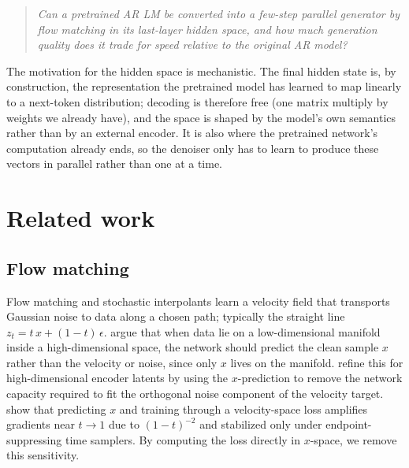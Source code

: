 \documentclass[11pt]{article}
\begin{document}
\begin{quote}\itshape
Can a pretrained AR LM be converted into a few-step parallel generator by flow matching in its last-layer hidden space, and how much generation quality does it trade for speed relative to the original AR model?
\end{quote}

The motivation for the hidden space is mechanistic. The final hidden state is, by construction, the representation the pretrained model has learned to map linearly to a next-token distribution; decoding is therefore free (one matrix multiply by weights we already have), and the space is shaped by the model's own semantics rather than by an external encoder. It is also where the pretrained network's computation already ends, so the denoiser only has to learn to produce these vectors in parallel rather than one at a time.

\section{Related work}

\subsection{Flow matching}
Flow matching \citep{lipman2023flow,liu2023rectified} and stochastic interpolants \citep{albergo2025stochastic} learn a velocity field that transports Gaussian noise to data along a chosen path; typically the straight line $z_t = t\,x + (1-t)\,\epsilon$. \citet{li2025backtobasics} argue that when data lie on a low-dimensional manifold inside a high-dimensional space, the network should predict the clean sample $x$ rather than the velocity or noise, since only $x$ lives on the manifold. \citet{feng2026diffusibility} refine this for high-dimensional encoder latents by using the $x$-prediction to remove the network capacity required to fit the orthogonal noise component of the velocity target. \citet{hong2026alignment} show that predicting $x$ and training through a velocity-space loss amplifies gradients near $t\!\to\!1$ due to $(1-t)^{-2}$ and stabilized only under endpoint-suppressing time samplers. By computing the loss directly in $x$-space, we remove this sensitivity.
\end{document}
